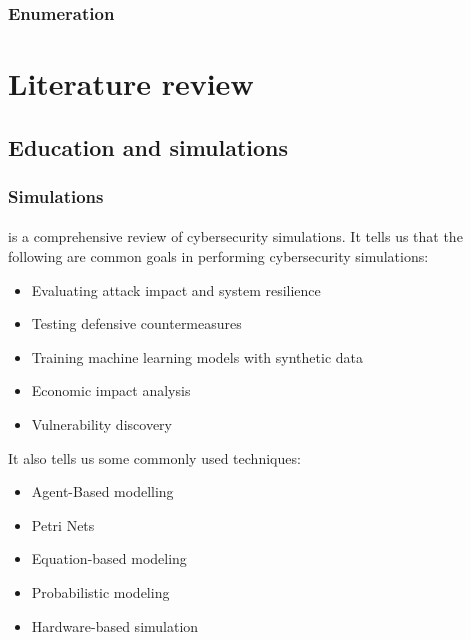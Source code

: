 \subsubsection{Enumeration}

\section{Literature review}

\subsection{Education and simulations}

\subsubsection{Simulations}

\paragraph{}\cite{serena_simulation_2025} is a comprehensive review of cybersecurity simulations. It tells us that the following are common goals in performing cybersecurity simulations:
\begin{itemize}
    \item Evaluating attack impact and system resilience
    \item Testing defensive countermeasures
    \item Training machine learning models with synthetic data
    \item Economic impact analysis
    \item Vulnerability discovery
\end{itemize}
It also tells us some commonly used techniques:
\begin{itemize}
    \item Agent-Based modelling
    \item Petri Nets
    \item Equation-based modeling
    \item Probabilistic modeling
    \item Hardware-based simulation
\end{itemize}

